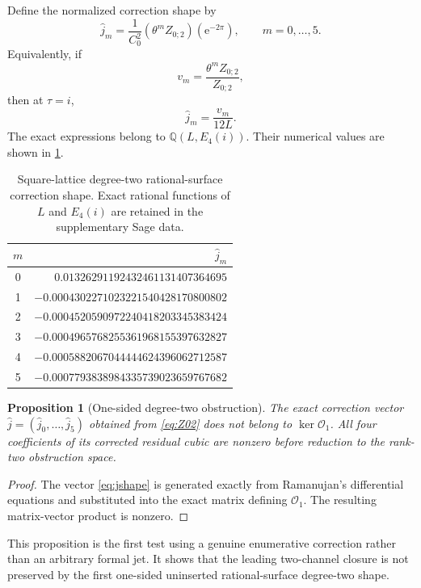 \documentclass[11pt]{article}
\newtheorem{proposition}[theorem]{Proposition}
\theoremstyle{definition}
\theoremstyle{remark}
\newcommand{\e}{\mathrm{e}}
\newcommand{\Q}{\mathbb{Q}}
\newcommand{\cO}{\mathcal{O}}
\newcommand{\kerop}{\operatorname{ker}}
\begin{document}
Define the normalized correction shape by
\begin{equation}\label{eq:jshape}
 \widehat j_m
 =\frac{1}{C_0^2}(\theta^mZ_{0;2})(\e^{-2\pi}),
 \qquad m=0,\ldots,5.
\end{equation}
Equivalently, if
\[
 v_m=\frac{\theta^mZ_{0;2}}{Z_{0;2}},
\]
then at \(\tau=i\),
\begin{equation}\label{eq:jv}
 \widehat j_m=\frac{v_m}{12L}.
\end{equation}
The exact expressions belong to \(\Q(L,E_4(i))\).  Their numerical values are shown in \cref{tab:jshape}.

\begin{table}[ht]
\centering
\begin{tabular}{cr}
\toprule
\(m\) & \(\widehat j_m\) \\
\midrule
0 & \(\phantom{-}0.01326291192432461131407364695\) \\
1 & \(-0.0004302271023221540428170800802\) \\
2 & \(-0.0004520590972240418203345383424\) \\
3 & \(-0.0004965768255361968155397632827\) \\
4 & \(-0.0005882067044444624396062712587\) \\
5 & \(-0.0007793838984335739023659767682\) \\
\bottomrule
\end{tabular}
\caption{Square-lattice degree-two rational-surface correction shape.  Exact rational functions of \(L\) and \(E_4(i)\) are retained in the supplementary Sage data.}
\label{tab:jshape}
\end{table}

\begin{proposition}[One-sided degree-two obstruction]\label{prop:onesided}
The exact correction vector \(\widehat j=(\widehat j_0,\ldots,\widehat j_5)\) obtained from \eqref{eq:Z02} does not belong to \(\kerop\cO_1\).  All four coefficients of its corrected residual cubic are nonzero before reduction to the rank-two obstruction space.
\end{proposition}

\begin{proof}
The vector \eqref{eq:jshape} is generated exactly from Ramanujan's differential equations and substituted into the exact matrix defining \(\cO_1\).  The resulting matrix-vector product is nonzero.
\end{proof}

This proposition is the first test using a genuine enumerative correction rather than an arbitrary formal jet.  It shows that the leading two-channel closure is not preserved by the first one-sided uninserted rational-surface degree-two shape.
\end{document}
